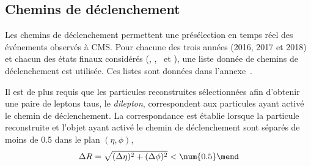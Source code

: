 \subsection{Chemins de déclenchement}\label{chapter-HTT_analysis-section-triggers}
Les chemins de déclenchement permettent une présélection en temps réel des événements observés à CMS.
Pour chacune des trois années (2016, 2017 et 2018) et chacun des états finaux considérés (\tauh\tauh, \mu\tauh, \ele\tauh\ et \ele\mu), une liste donnée de chemins de déclenchement est utilisée.
Ces listes sont données dans l'annexe~.
\par
Il est de plus requis que les particules reconstruites sélectionnées afin d'obtenir une paire de leptons taus, le \emph{dilepton}, correspondent aux particules ayant activé le chemin de déclenchement.
La correspondance est établie lorsque la particule reconstruite et l'objet ayant activé le chemin de déclenchement sont séparés de moins de \num{0.5} dans le plan $(\eta,\phi)$, \ie
\begin{equation}
\Delta R = \sqrt{(\Delta\eta)^2 + (\Delta\phi)^2} < \num{0.5}
\mend
\end{equation}